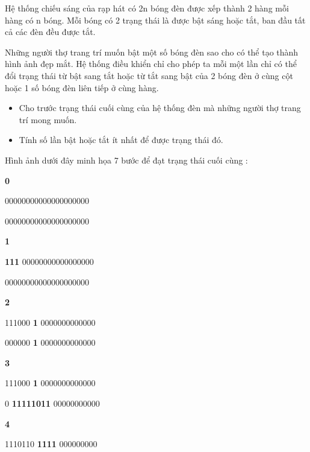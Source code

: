 Hệ thống chiếu sáng của rạp hát có 2n bóng đèn được xếp thành 2 hàng mỗi hàng có n bóng. Mỗi bóng có 2 trạng thái là được bật sáng hoặc tắt, ban đầu tất cả các đèn đều được tắt.  

   Những người thợ trang trí muốn bật một số bóng đèn sao cho có thể tạo thành hình ảnh đẹp mắt. Hệ thống điều khiển chỉ cho phép ta mỗi một lần chỉ có thể đổi trạng thái từ bật sang tắt hoặc từ tắt sang bật của 2 bóng đèn ở cùng cột hoặc 1 số bóng đèn liên tiếp ở cùng hàng.  

\begin{itemize}
	\item     Cho trước trạng thái cuối cùng của hệ thống đèn mà những người thợ trang trí mong muốn.   
	\item     Tính số lần bật hoặc tắt ít nhất để được trạng thái đó.   
\end{itemize}









   Hình ảnh dưới đây minh họa 7 bước để đạt trạng thái cuối cùng :  



\textbf{          0         }

         00000000000000000000                          

         00000000000000000000                          

\textbf{          1         }

\textbf{          111         }         00000000000000000                          

         00000000000000000000                          

\textbf{          2         }

         111000         \textbf{          1         }         0000000000000                          

         000000         \textbf{          1         }         0000000000000                          

\textbf{          3         }

         111000         \textbf{          1         }         0000000000000        

         0         \textbf{          11111011         }         00000000000                          

\textbf{          4         }

         1110110         \textbf{          1111         }         000000000                          


